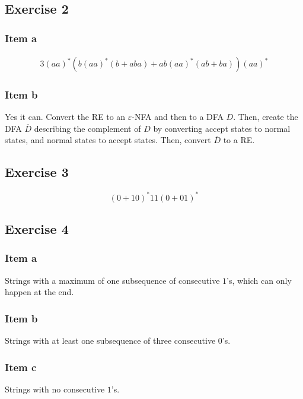 {\begin{center}
\end{center}
\subsection{Exercise 2}
\subsubsection{Item a}
\begin{alignat*}{3}
	 (aa)^* (b  (aa)^* ( b + aba ) + ab (aa)^* ( ab + ba ))(aa)^*
\end{alignat*}
\subsubsection{Item b}
Yes it can. Convert the RE to an $\varepsilon$-NFA and then to a DFA $D$. Then, create the DFA $\overline{D}$ describing the complement of $D$ by converting accept states to normal states, and normal states to accept states. Then, convert $\overline{D}$ to a RE.
\pagebreak
\subsection{Exercise 3}
\begin{equation*}
	(0 + 10)^* 11 (0 + 01)^*
\end{equation*}
\subsection{Exercise 4}
\subsubsection{Item a}
Strings with a maximum of one subsequence of consecutive $1$'s, which can only happen at the end.
\subsubsection{Item b}
Strings with at least one subsequence of three consecutive $0$'s.
\subsubsection{Item c}
Strings with no consecutive $1$'s.
}
